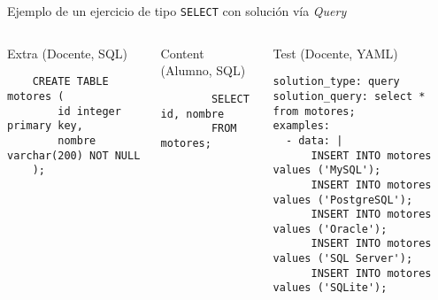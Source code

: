 Ejemplo de un ejercicio de tipo \texttt{SELECT} con solución vía \textit{Query}

\begin{columns}[t]
    \begin{listing}[H]
        \caption{Extra (Docente, SQL)}
        \begin{verbatim}
    CREATE TABLE motores (
        id integer primary key,
        nombre varchar(200) NOT NULL
    );
        \end{verbatim}
    \end{listing}

    \begin{listing}[H]
        \caption{Content (Alumno, SQL)}
        \begin{verbatim}
        SELECT id, nombre
        FROM motores;
        \end{verbatim}
    \end{listing}

    \begin{listing}[H]
        \caption{Test (Docente, YAML)}
        \begin{verbatim}
solution_type: query
solution_query: select * from motores;
examples:
  - data: |
      INSERT INTO motores values ('MySQL');
      INSERT INTO motores values ('PostgreSQL');
      INSERT INTO motores values ('Oracle');
      INSERT INTO motores values ('SQL Server');
      INSERT INTO motores values ('SQLite');
        \end{verbatim}
    \end{listing}

\end{columns}
